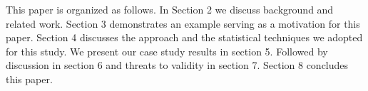 

	

This paper is organized as follows. In Section 2 we discuss background and related work. Section 3 demonstrates an example serving as a motivation for this paper. Section 4 discusses the approach and the statistical techniques we adopted for this study. We present our case study results in section 5. Followed by discussion in section 6 and threats to validity in section 7. Section 8 concludes this paper.
